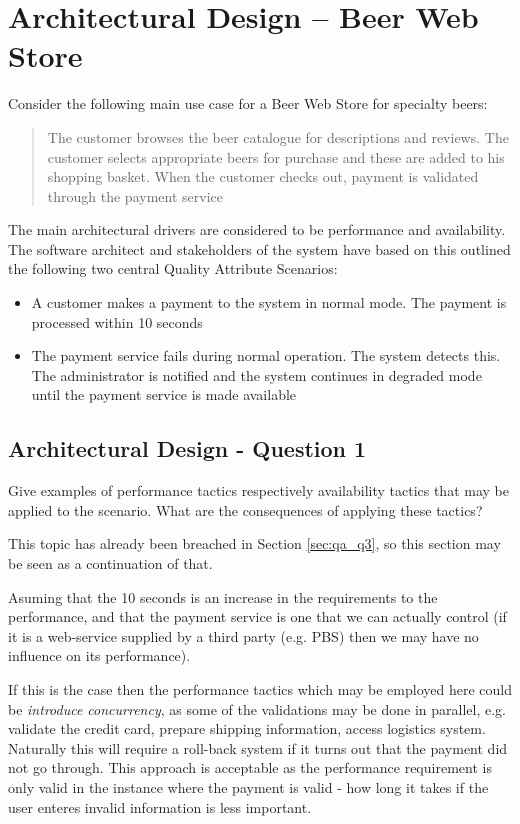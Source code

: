 \section{Architectural Design -- Beer Web Store}
Consider the following main use case for a Beer Web Store for specialty
beers:
\begin{quote}
  The customer browses the beer catalogue for descriptions and
  reviews. The customer selects appropriate beers for purchase and
  these are added to his shopping basket. When the customer checks
  out, payment is validated through the payment service
\end{quote}
The main architectural drivers are considered to be performance and
availability. The software architect and stakeholders of the system
have based on this outlined the following two central Quality
Attribute Scenarios:
\begin{itemize}
  \item A customer makes a payment to the system in normal mode. The
  payment is processed within 10 seconds
  \item The payment service fails during normal operation. The system
  detects this. The administrator is notified and the system continues
  in degraded mode until the payment service is made available
\end{itemize}

\subsection{Architectural Design - Question 1}

\begin{question}
Give examples of performance tactics respectively availability
tactics that may be applied to the scenario. What are the consequences
of applying these tactics?
\end{question}

This topic has already been breached in Section \ref{sec:qa_q3}, so this section may be seen as a continuation of that.

Asuming that the 10 seconds is an increase in the requirements to the performance, and that the payment service is one that we can actually control (if it is a web-service supplied by a third party (e.g. PBS) then we may have no influence on its performance). 

If this is the case then the performance tactics which may be employed here could be \emph{introduce concurrency}, as some of the validations may be done in parallel, e.g. validate the credit card, prepare shipping information, access logistics system. Naturally this will require a roll-back system if it turns out that the payment did not go through. This approach is acceptable as the performance requirement is only valid in the instance where the payment is valid - how long it takes if the user enteres invalid information is less important. 

